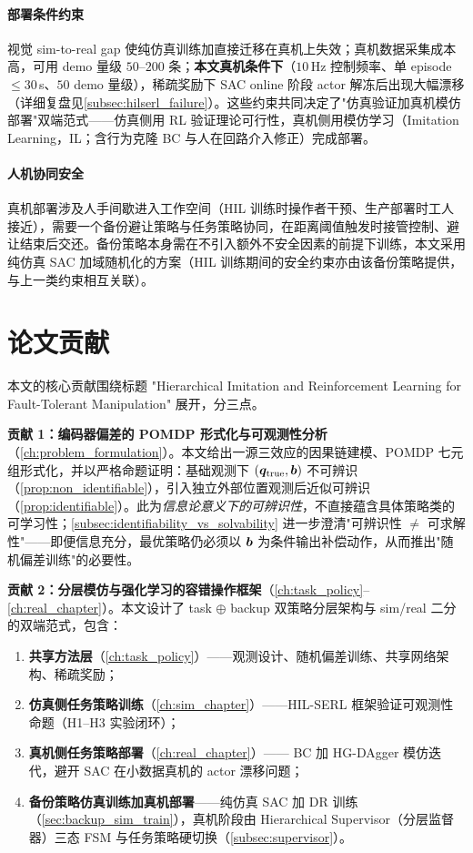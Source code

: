 \paragraph{部署条件约束}视觉 sim-to-real gap 使纯仿真训练加直接迁移在真机上失效；真机数据采集成本高，可用 demo 量级 $50$–$200$ 条；\textbf{本文真机条件下}（$10$\,Hz 控制频率、单 episode $\le 30$\,s、$50$ demo 量级），稀疏奖励下 SAC online 阶段 actor 解冻后出现大幅漂移（详细复盘见\cref{subsec:hilserl_failure}）。这些约束共同决定了"仿真验证加真机模仿部署"双端范式——仿真侧用 RL 验证理论可行性，真机侧用模仿学习（Imitation Learning，IL；含行为克隆 BC 与人在回路介入修正）完成部署。

\paragraph{人机协同安全}真机部署涉及人手间歇进入工作空间（HIL 训练时操作者干预、生产部署时工人接近），需要一个备份避让策略与任务策略协同，在距离阈值触发时接管控制、避让结束后交还。备份策略本身需在不引入额外不安全因素的前提下训练，本文采用纯仿真 SAC 加域随机化的方案（HIL 训练期间的安全约束亦由该备份策略提供，与上一类约束相互关联）。

\section{论文贡献}\label{sec:contributions}

本文的核心贡献围绕标题 "Hierarchical Imitation and Reinforcement Learning for Fault-Tolerant Manipulation" 展开，分三点。

\textbf{贡献 1：编码器偏差的 POMDP 形式化与可观测性分析}（\cref{ch:problem_formulation}）。本文给出一源三效应的因果链建模、POMDP 七元组形式化，并以严格命题证明：基础观测下 $(\bm{q}_{\text{true}}, \bm{b})$ 不可辨识（\cref{prop:non_identifiable}），引入独立外部位置观测后近似可辨识（\cref{prop:identifiable}）。此为\emph{信息论意义下的可辨识性}，不直接蕴含具体策略类的可学习性；\cref{subsec:identifiability_vs_solvability} 进一步澄清"可辨识性 $\neq$ 可求解性"——即便信息充分，最优策略仍必须以 $\bm{b}$ 为条件输出补偿动作，从而推出"随机偏差训练"的必要性。

\textbf{贡献 2：分层模仿与强化学习的容错操作框架}（\cref{ch:task_policy}–\cref{ch:real_chapter}）。本文设计了 task $\oplus$ backup 双策略分层架构与 sim/real 二分的双端范式，包含：

\begin{enumerate}
  \item \textbf{共享方法层}（\cref{ch:task_policy}）——观测设计、随机偏差训练、共享网络架构、稀疏奖励；
  \item \textbf{仿真侧任务策略训练}（\cref{ch:sim_chapter}）——HIL-SERL 框架验证可观测性命题（H1–H3 实验闭环）；
  \item \textbf{真机侧任务策略部署}（\cref{ch:real_chapter}）—— BC 加 HG-DAgger 模仿迭代，避开 SAC 在小数据真机的 actor 漂移问题；
  \item \textbf{备份策略仿真训练加真机部署}——纯仿真 SAC 加 DR 训练（\cref{sec:backup_sim_train}），真机阶段由 Hierarchical Supervisor（分层监督器）三态 FSM 与任务策略硬切换（\cref{subsec:supervisor}）。
\end{enumerate}

